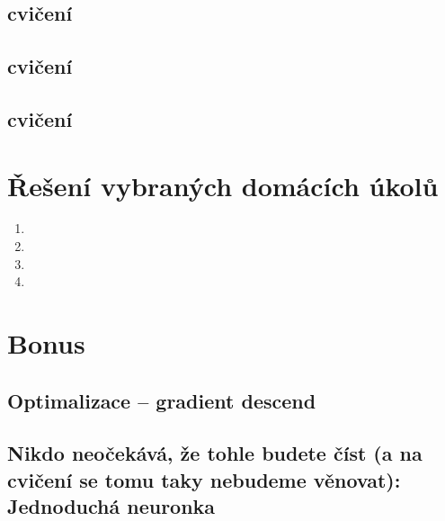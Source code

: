 \documentclass[a4paper,10pt]{book}
\begin{document}
	\section[12. cvičení]{cvičení}
 
	\section[13. cvičení]{cvičení}
 
	\section[14. cvičení]{cvičení}
 

\chapter{Řešení vybraných domácích úkolů}

\begin{enumerate}
	\item  {}
	\item  {}
	\item  {}
	\item  {}
\end{enumerate}

\chapter{Bonus}

\section{Optimalizace -- gradient descend}

\section{Nikdo neočekává, že tohle budete číst (a na cvičení se tomu taky nebudeme věnovat): Jednoduchá neuronka}

\end{document}
